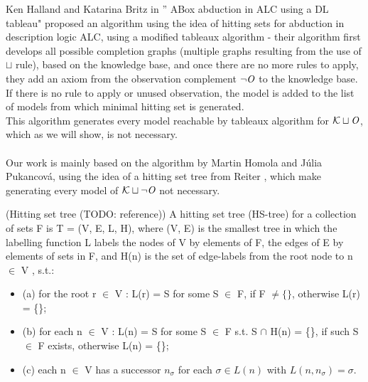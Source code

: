  Ken Halland and Katarina Britz in '' ABox abduction in ALC using a DL tableau" \cite{halland2012} proposed an algorithm using the idea of hitting sets for abduction in description logic ALC, using a modified tableaux algorithm - their algorithm first develops all possible completion graphs (multiple graphs resulting from the use of $\sqcup$ rule), based on the knowledge base, and once there are no more rules to apply, they add an axiom from the observation complement $\neg \mathit{O}$ to the knowledge base. If there is no rule to apply or unused observation, the model is added to the list of models from which minimal hitting set is generated. \\ This algorithm generates every model reachable by tableaux algorithm for $\mathcal{K} \sqcup \mathit{O}$, which as we will show, is not necessary. \\ \\
Our work is mainly based on the algorithm by Martin Homola and Júlia Pukancová, using the idea of a hitting set tree from Reiter \cite{Reiter1987}, which make generating every model of $\mathcal{K} \sqcup \neg \mathit{O}$ not necessary. 

\begin{mydef} \label{HSTree} (Hitting set tree  (TODO: reference))
	A hitting set tree (HS-tree) for a collection of sets F is T = (V, E, L, H), where
	(V, E) is the smallest tree in which the labelling function L labels the nodes of V
	by elements of F, the edges of E by elements of sets in F, and H(n) is the set
	of edge-labels from the root node to n $\in$ V , s.t.: \begin{itemize} \item (a)
		 for the root r $\in$ V : L(r) = S for some S $\in$ F, if F $\neq \{\}$, otherwise L(r) = \{\}; 
\item(b) for each n $\in$ V : L(n) = S
	for some S $\in$ F s.t. S $\cap$ H(n) = \{\}, if such S $\in$ F exists, otherwise L(n) = \{\};
\item	(c) each n $\in$ V has a successor $n_\sigma $ for each $\sigma \in L(n)$ with $L(n, n_\sigma ) = \sigma$.
\end{itemize}
\end{mydef}

